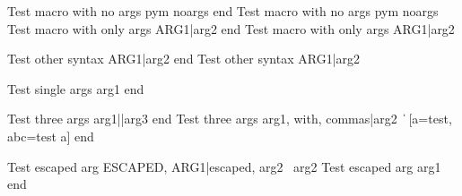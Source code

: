 \documentclass{article}
\author{Macro Arg Test}
\begin{document}
	Test macro with no args pym noargs \test end
	Test macro with no args pym noargs \test\other
	Test macro with only args ARG1|arg2 end
	Test macro with only args ARG1|arg2\other

	Test other syntax ARG1|arg2 end
	Test other syntax ARG1|arg2\other

	Test single args arg1 end

	Test three args arg1||arg3 end
	Test three args arg1, with, commas|arg2 \ \| [a=test, abc=test a] end

	Test escaped arg {ESCAPED, ARG1}|{escaped, arg2 \ arg2}
	Test escaped arg {arg1} end
\end{document}

